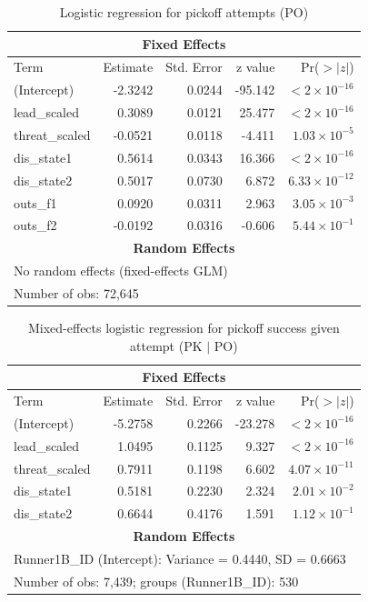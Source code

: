 \documentclass[12pt,letterpaper]{article}
\begin{document}
\begin{table}[htbp]
\centering
\caption{Logistic regression for pickoff attempts (PO)}
\label{tab:po}
\begin{tabular}{lrrrr}
\toprule
\multicolumn{5}{c}{\textbf{Fixed Effects}} \\
\midrule
Term & Estimate & Std. Error & z value & Pr($>|z|$) \\
\midrule
(Intercept)      & -2.3242 & 0.0244 & -95.142 & $< 2\times10^{-16}$ \\
lead\_scaled     &  0.3089 & 0.0121 &  25.477 & $< 2\times10^{-16}$ \\
threat\_scaled   & -0.0521 & 0.0118 &  -4.411 & $1.03\times10^{-5}$ \\
dis\_state1      &  0.5614 & 0.0343 &  16.366 & $< 2\times10^{-16}$ \\
dis\_state2      &  0.5017 & 0.0730 &   6.872 & $6.33\times10^{-12}$ \\
outs\_f1         &  0.0920 & 0.0311 &   2.963 & $3.05\times10^{-3}$ \\
outs\_f2         & -0.0192 & 0.0316 &  -0.606 & $5.44\times10^{-1}$ \\
\midrule
\multicolumn{5}{c}{\textbf{Random Effects}} \\
\midrule
\multicolumn{5}{l}{No random effects (fixed-effects GLM)} \\
\multicolumn{5}{l}{Number of obs: 72,645} \\
\bottomrule
\end{tabular}
\end{table}

\begin{table}[htbp]
\centering
\caption{Mixed-effects logistic regression for pickoff success given attempt (PK $\mid$ PO)}
\label{tab:pk_po}
\begin{tabular}{lrrrr}
\toprule
\multicolumn{5}{c}{\textbf{Fixed Effects}} \\
\midrule
Term & Estimate & Std. Error & z value & Pr($>|z|$) \\
\midrule
(Intercept)      & -5.2758 & 0.2266 & -23.278 & $< 2\times10^{-16}$ \\
lead\_scaled     &  1.0495 & 0.1125 &   9.327 & $< 2\times10^{-16}$ \\
threat\_scaled   &  0.7911 & 0.1198 &   6.602 & $4.07\times10^{-11}$ \\
dis\_state1      &  0.5181 & 0.2230 &   2.324 & $2.01\times10^{-2}$ \\
dis\_state2      &  0.6644 & 0.4176 &   1.591 & $1.12\times10^{-1}$ \\
\midrule
\multicolumn{5}{c}{\textbf{Random Effects}} \\
\midrule
\multicolumn{5}{l}{Runner1B\_ID (Intercept): Variance = 0.4440, SD = 0.6663} \\
\multicolumn{5}{l}{Number of obs: 7,439; groups (Runner1B\_ID): 530} \\
\bottomrule
\end{tabular}
\end{table}
\end{document}

